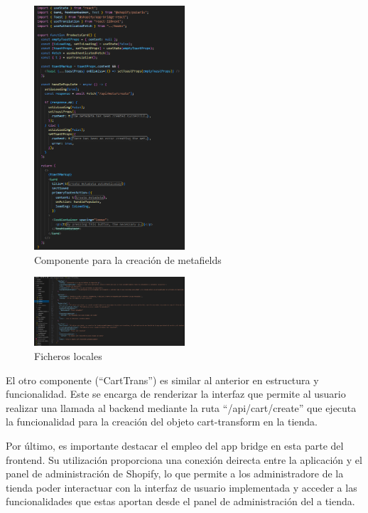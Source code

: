 \documentclass[12pt]{article}
\begin{document}
\begin{figure}[ht]
    \centering
    \includegraphics[width=0.5\textwidth]{imagenes-admin/metafieldComponent.png}
    \caption{\label{fig:componenteMetafield} Componente para la creación de metafields }
    \vspace{\fill}
\end{figure}


\begin{figure}[ht]
    \centering
    \includegraphics[width=0.5\textwidth]{imagenes-admin/locales-admin.png}
    \caption{\label{fig:localesAdmin} Ficheros locales }
    \vspace{\fill}
\end{figure}

El otro componente (``CartTrans'') es similar al anterior en estructura y funcionalidad. Este se encarga de renderizar la interfaz que permite al usuario realizar una llamada al backend mediante
la ruta ``/api/cart/create'' que ejecuta la funcionalidad para la creación del objeto cart-transform en la tienda.

Por último, es importante destacar el empleo del app bridge en esta parte del frontend. Su utilización proporciona una conexión deirecta entre la aplicación y el panel 
de administración de Shopify, lo que permite a los administradore de la tienda poder interactuar con la interfaz de usuario implementada y acceder a las funcionalidades que estas aportan
desde el panel de administración del a tienda.
\end{document}
